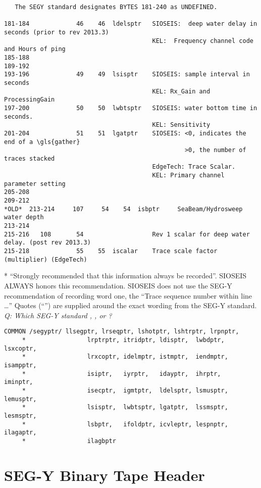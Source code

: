 \begin{verbatim}
   The SEGY standard designates BYTES 181-240 as UNDEFINED.

181-184             46    46  ldelsptr   SIOSEIS:  deep water delay in seconds (prior to rev 2013.3)
                                         KEL:  Frequency channel code and Hours of ping
185-188
189-192
193-196             49    49  lsisptr    SIOSEIS: sample interval in seconds
                                         KEL: Rx_Gain and ProcessingGain
197-200             50    50  lwbtsptr   SIOSEIS: water bottom time in seconds.
                                         KEL: Sensitivity
201-204             51    51  lgatptr    SIOSEIS: <0, indicates the end of a \gls{gather}
                                                  >0, the number of traces stacked
                                         EdgeTech: Trace Scalar.
                                         KEL: Primary channel parameter setting
205-208
209-212
*OLD*  213-214     107     54    54  isbptr     SeaBeam/Hydrosweep water depth
213-214
215-216   108       54                   Rev 1 scalar for deep water delay. (post rev 2013.3)
215-218             55    55  iscalar    Trace scale factor (multiplier) (EdgeTech)

\end{verbatim}
* \enquote{Strongly recommended that this information always be recorded}.
  SIOSEIS ALWAYS honors this recommendation.  SIOSEIS does not use the
  SEG-Y recommendation of recording word one, the \enquote{Trace sequence
  number within line \ldots}
Quotes (``'') are supplied around the exact wording from the SEG-Y standard.
\emph{Q: Which SEG-Y standard \cite{SEG_Y_r0}, \cite{SEG_Y_r1}, or \cite{SEG_Y_r2}?}

\lstset{language=[77]Fortran}
\begin{lstlisting}[caption={SEGYPTR COMMON Block}]
      COMMON /segyptr/ llsegptr, lrseqptr, lshotptr, lshtrptr, lrpnptr,
     *                 lrptrptr, itridptr, ldisptr,  lwbdptr,  lsxcoptr,
     *                 lrxcoptr, idelmptr, istmptr,  iendmptr, isampptr,
     *                 isiptr,   iyrptr,   idayptr,  ihrptr,   iminptr,
     *                 isecptr,  igmtptr,  ldelsptr, lsmusptr, lemusptr,
     *                 lsisptr,  lwbtsptr, lgatptr,  lssmsptr, lesmsptr,
     *                 lsbptr,   ifoldptr, icvleptr, lespnptr, ilagaptr,
     *                 ilagbptr
\end{lstlisting}

\section{SEG-Y Binary Tape Header}

